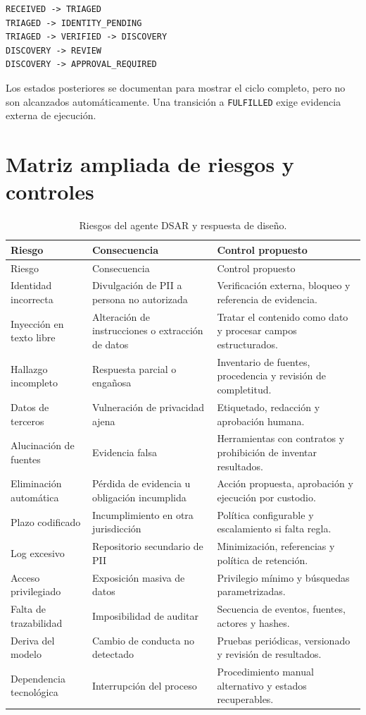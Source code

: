 \documentclass[11pt,a4paper]{article}
\begin{document}
\begin{lstlisting}[language={},caption={Transiciones habilitadas en el prototipo.}]
RECEIVED -> TRIAGED
TRIAGED -> IDENTITY_PENDING
TRIAGED -> VERIFIED -> DISCOVERY
DISCOVERY -> REVIEW
DISCOVERY -> APPROVAL_REQUIRED
\end{lstlisting}

Los estados posteriores se documentan para mostrar el ciclo completo, pero no son alcanzados automáticamente. Una transición a \texttt{FULFILLED} exige evidencia externa de ejecución.

\section{Matriz ampliada de riesgos y controles}

\begin{longtable}{p{3.8cm}p{5.2cm}p{5.8cm}}
\caption{Riesgos del agente DSAR y respuesta de diseño.}\\
\toprule
Riesgo & Consecuencia & Control propuesto \\
\midrule
\endfirsthead
\toprule
Riesgo & Consecuencia & Control propuesto \\
\midrule
\endhead
Identidad incorrecta & Divulgación de PII a persona no autorizada & Verificación externa, bloqueo y referencia de evidencia. \\
Inyección en texto libre & Alteración de instrucciones o extracción de datos & Tratar el contenido como dato y procesar campos estructurados. \\
Hallazgo incompleto & Respuesta parcial o engañosa & Inventario de fuentes, procedencia y revisión de completitud. \\
Datos de terceros & Vulneración de privacidad ajena & Etiquetado, redacción y aprobación humana. \\
Alucinación de fuentes & Evidencia falsa & Herramientas con contratos y prohibición de inventar resultados. \\
Eliminación automática & Pérdida de evidencia u obligación incumplida & Acción propuesta, aprobación y ejecución por custodio. \\
Plazo codificado & Incumplimiento en otra jurisdicción & Política configurable y escalamiento si falta regla. \\
Log excesivo & Repositorio secundario de PII & Minimización, referencias y política de retención. \\
Acceso privilegiado & Exposición masiva de datos & Privilegio mínimo y búsquedas parametrizadas. \\
Falta de trazabilidad & Imposibilidad de auditar & Secuencia de eventos, fuentes, actores y hashes. \\
Deriva del modelo & Cambio de conducta no detectado & Pruebas periódicas, versionado y revisión de resultados. \\
Dependencia tecnológica & Interrupción del proceso & Procedimiento manual alternativo y estados recuperables. \\
\bottomrule
\end{longtable}
\end{document}
